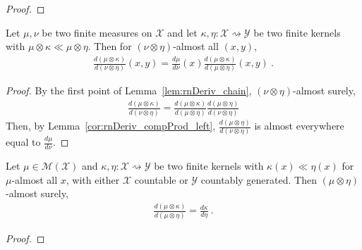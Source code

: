 \begin{proof}\leanok
\uses{}
\end{proof}


\begin{theorem}
  \label{thm:rnDeriv_chain_compProd}
  \leanok
  \uses{}
  Let $\mu, \nu$ be two finite measures on $\mathcal X$ and let $\kappa, \eta : \mathcal X \rightsquigarrow \mathcal Y$ be two finite kernels with $\mu \otimes \kappa \ll \mu \otimes \eta$. Then for $(\nu \otimes \eta)$-almost all $(x,y)$,
  \begin{align*}
  \frac{d(\mu \otimes \kappa)}{d(\nu \otimes \eta)}(x, y)
  = \frac{d \mu}{d \nu}(x) \frac{d(\mu \otimes \kappa)}{d(\mu \otimes \eta)}(x, y)
  \: .
  \end{align*}
\end{theorem}

\begin{proof}\leanok
{}
By the first point of Lemma~\ref{lem:rnDeriv_chain}, $(\nu \otimes \eta)$-almost surely,
\begin{align*}
\frac{d(\mu \otimes \kappa)}{d(\nu \otimes \eta)}
  = \frac{d(\mu \otimes \kappa)}{d(\mu \otimes \eta)} \frac{d (\mu \otimes \eta)}{d (\nu \otimes \eta)} 
\end{align*}
Then, by Lemma~\ref{cor:rnDeriv_compProd_left}, $\frac{d (\mu \otimes \eta)}{d (\nu \otimes \eta)}$ is almost everywhere equal to $\frac{d\mu}{d\nu}$.
\end{proof}


\begin{lemma}
  \label{lem:rnDeriv_compProd_right_of_ac}
  Let $\mu \in \mathcal M(\mathcal X)$ and $\kappa, \eta : \mathcal X \rightsquigarrow \mathcal Y$ be two finite kernels with $\kappa(x) \ll \eta(x)$ for $\mu$-almost all $x$, with either $\mathcal X$ countable or $\mathcal{Y}$ countably generated.
  Then $(\mu \otimes \eta)$-almost surely,
  \begin{align*}
  \frac{d (\mu \otimes \kappa)}{d (\mu \otimes \eta)} = \frac{d \kappa}{d \eta}
  \: .
  \end{align*}
\end{lemma}

\begin{proof}%
\uses{}

\end{proof}


